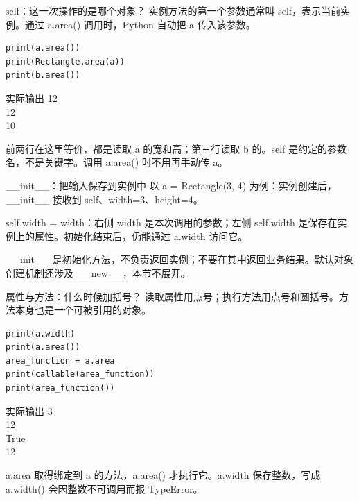 \documentclass[9pt]{ctexbeamer}
\begin{document}
\begin{frame}[fragile]{self：这一次操作的是哪个对象？}
实例方法的第一个参数通常叫 self，表示当前实例。通过 a.area() 调用时，Python 自动把 a 传入该参数。
\begin{lstlisting}
print(a.area())
print(Rectangle.area(a))
print(b.area())
\end{lstlisting}
\begin{exampleblock}{实际输出}
{\ttfamily\small 12\\
12\\
10}
\end{exampleblock}
\small 前两行在这里等价，都是读取 a 的宽和高；第三行读取 b 的。self 是约定的参数名，不是关键字。调用 a.area() 时不用再手动传 a。
\par{}

\end{frame}

\begin{frame}{\_\_init\_\_：把输入保存到实例中}
以 a = Rectangle(3, 4) 为例：实例创建后，\_\_init\_\_ 接收到 self、width=3、height=4。
\par
self.width = width：右侧 width 是本次调用的参数；左侧 self.width 是保存在实例上的属性。初始化结束后，仍能通过 a.width 访问它。
\par
\_\_init\_\_ 是初始化方法，不负责返回实例；不要在其中返回业务结果。默认对象创建机制还涉及 \_\_new\_\_，本节不展开。
\par{}

\end{frame}

\begin{frame}[fragile]{属性与方法：什么时候加括号？}
读取属性用点号；执行方法用点号和圆括号。方法本身也是一个可被引用的对象。
\begin{lstlisting}
print(a.width)
print(a.area())
area_function = a.area
print(callable(area_function))
print(area_function())
\end{lstlisting}
\begin{exampleblock}{实际输出}
{\ttfamily\small 3\\
12\\
True\\
12}
\end{exampleblock}
\small a.area 取得绑定到 a 的方法，a.area() 才执行它。a.width 保存整数，写成 a.width() 会因整数不可调用而报 TypeError。
\par{}

\end{frame}
\end{document}
